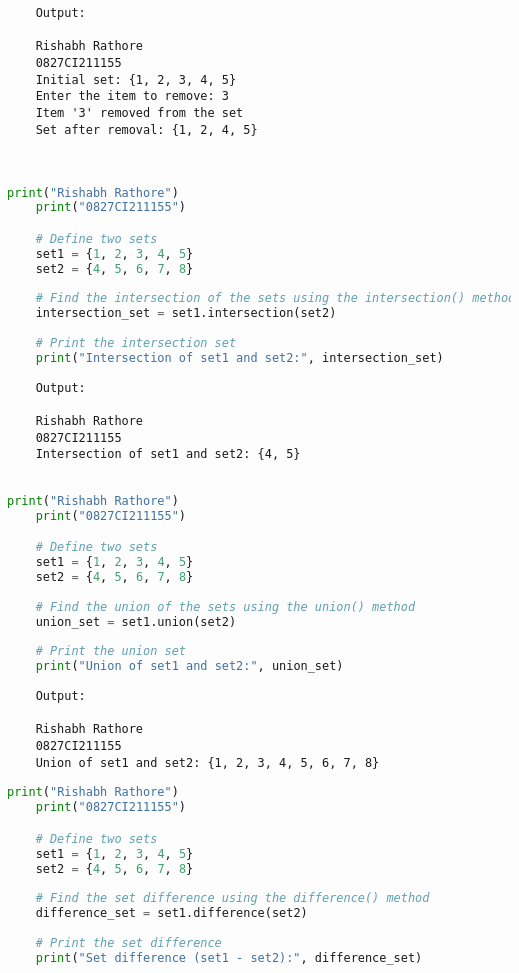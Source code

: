 \documentclass{report}
\begin{document}
\begin{verbatim}
	Output:

	Rishabh Rathore
	0827CI211155
	Initial set: {1, 2, 3, 4, 5}
	Enter the item to remove: 3
	Item '3' removed from the set
	Set after removal: {1, 2, 4, 5}
	
	

\end{verbatim}


\newpage


\sol 
\begin{lstlisting}[language=Python]
	print("Rishabh Rathore")
	print("0827CI211155")

	# Define two sets
	set1 = {1, 2, 3, 4, 5}
	set2 = {4, 5, 6, 7, 8}
	
	# Find the intersection of the sets using the intersection() method
	intersection_set = set1.intersection(set2)
	
	# Print the intersection set
	print("Intersection of set1 and set2:", intersection_set)
\end{lstlisting}

\begin{verbatim}
	Output:

	Rishabh Rathore
	0827CI211155
	Intersection of set1 and set2: {4, 5}
	
\end{verbatim}


\newpage


\sol 
\begin{lstlisting}[language=Python]
	print("Rishabh Rathore")
	print("0827CI211155")

	# Define two sets
	set1 = {1, 2, 3, 4, 5}
	set2 = {4, 5, 6, 7, 8}
	
	# Find the union of the sets using the union() method
	union_set = set1.union(set2)
	
	# Print the union set
	print("Union of set1 and set2:", union_set)
\end{lstlisting}

\begin{verbatim}
	Output:

	Rishabh Rathore
	0827CI211155
	Union of set1 and set2: {1, 2, 3, 4, 5, 6, 7, 8}

\end{verbatim}


\newpage


\sol 
\begin{lstlisting}[language=Python]
	print("Rishabh Rathore")
	print("0827CI211155")

	# Define two sets
	set1 = {1, 2, 3, 4, 5}
	set2 = {4, 5, 6, 7, 8}
	
	# Find the set difference using the difference() method
	difference_set = set1.difference(set2)
	
	# Print the set difference
	print("Set difference (set1 - set2):", difference_set)
\end{lstlisting}
\end{document}
